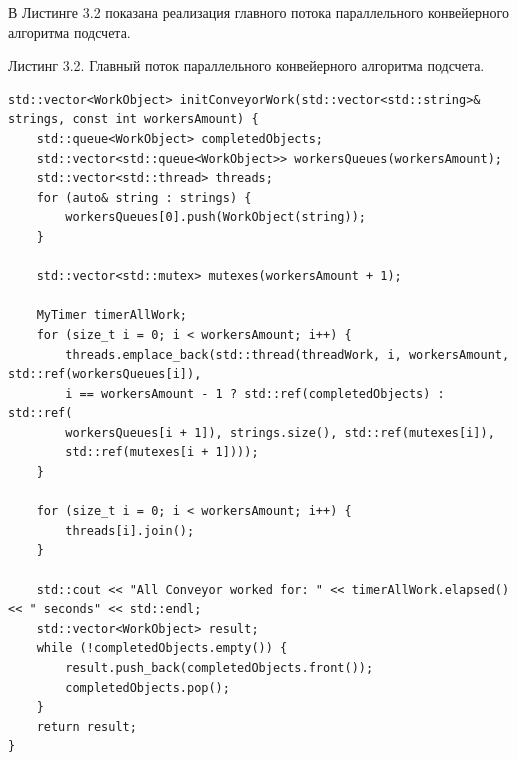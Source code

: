\documentclass[12pt]{report}
\begin{document}
\vspace{\baselineskip}

В Листинге 3.2 показана реализация главного потока параллельного конвейерного алгоритма подсчета.

\begin{flushleft}
Листинг 3.2. Главный поток параллельного конвейерного алгоритма подсчета.
\begin{lstlisting}
std::vector<WorkObject> initConveyorWork(std::vector<std::string>& strings, const int workersAmount) {
	std::queue<WorkObject> completedObjects;
	std::vector<std::queue<WorkObject>> workersQueues(workersAmount);
	std::vector<std::thread> threads;
	for (auto& string : strings) {
		workersQueues[0].push(WorkObject(string));
	}
	
	std::vector<std::mutex> mutexes(workersAmount + 1);
	
	MyTimer timerAllWork;
	for (size_t i = 0; i < workersAmount; i++) {
		threads.emplace_back(std::thread(threadWork, i, workersAmount, std::ref(workersQueues[i]),
		i == workersAmount - 1 ? std::ref(completedObjects) : std::ref(
		workersQueues[i + 1]), strings.size(), std::ref(mutexes[i]),
		std::ref(mutexes[i + 1])));
	}
	
	for (size_t i = 0; i < workersAmount; i++) {
		threads[i].join();
	}
	
	std::cout << "All Conveyor worked for: " << timerAllWork.elapsed() << " seconds" << std::endl;
	std::vector<WorkObject> result;
	while (!completedObjects.empty()) {
		result.push_back(completedObjects.front());
		completedObjects.pop();
	}
	return result;
}
\end{lstlisting}
\end{flushleft}
\end{document}
